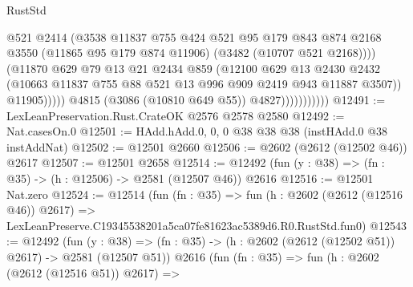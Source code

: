 \begin{lexlean}{RustStd}
\begin{coremodule}
                                    @521
                                    @2414
                                    (@3538
                                      @11837
                                      @755
                                      @424
                                      @521
                                      @95
                                      @179
                                      @843
                                      @874
                                      @2168
                                      @3550
                                      (@11865 @95 @179 @874 @11906)
                                      (@3482 (@10707 @521 @2168))))
                                  (@11870
                                    @629
                                    @79
                                    @13
                                    @21
                                    @2434
                                    @859
                                    (@12100
                                      @629
                                      @13
                                      @2430
                                      @2432
                                      (@10663
                                        @11837
                                        @755
                                        @88
                                        @521
                                        @13
                                        @996
                                        @909
                                        @2419
                                        @943
                                        @11887
                                        @3507))
                                    @11905)))))
                          @4815
                          (@3086 (@10810 @649 @55))
                          @4827)))))))))))
@12491 := LexLeanPreservation.Rust.CrateOK @2576 @2578 @2580
@12492 := Nat.casesOn.{0}
@12501 := HAdd.hAdd.{0, 0, 0} @38 @38 @38 (instHAdd.{0} @38 instAddNat)
@12502 := @12501 @2660
@12506 := @2602 (@2612 (@12502 @46)) @2617
@12507 := @12501 @2658
@12514 := @12492 (fun (y : @38) => (fn : @35) -> (h : @12506) -> @2581 (@12507 @46)) @2616
@12516 := @12501 Nat.zero
@12524 := @12514
    (fun (fn : @35) =>
    fun (h : @2602 (@2612 (@12516 @46)) @2617) =>
    LexLeanPreserve.C19345538201a5ca07fe81623ac5389d6.R0.RustStd.fun0)
@12543 := @12492
    (fun (y : @38) => (fn : @35) -> (h : @2602 (@2612 (@12502 @51)) @2617) -> @2581 (@12507 @51))
    @2616
    (fun (fn : @35) =>
    fun (h : @2602 (@2612 (@12516 @51)) @2617) =>

\end{coremodule}
\end{lexlean}
